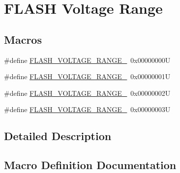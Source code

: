 \hypertarget{group___f_l_a_s_h_ex___voltage___range}{}\section{F\+L\+A\+SH Voltage Range}
\label{group___f_l_a_s_h_ex___voltage___range}
\subsection*{Macros}
\begin{DoxyCompactItemize}
\item 
\#define \hyperlink{group___f_l_a_s_h_ex___voltage___range_ga5cadf49a63c968cde3b980e5139d398e}{F\+L\+A\+S\+H\+\_\+\+V\+O\+L\+T\+A\+G\+E\+\_\+\+R\+A\+N\+G\+E\+\_}~0x00000000U
\item 
\#define \hyperlink{group___f_l_a_s_h_ex___voltage___range_gad047be2bc7aa9be946b5b0c6b3062ef3}{F\+L\+A\+S\+H\+\_\+\+V\+O\+L\+T\+A\+G\+E\+\_\+\+R\+A\+N\+G\+E\+\_}~0x00000001U
\item 
\#define \hyperlink{group___f_l_a_s_h_ex___voltage___range_ga50950407a789684eec9216f49e0831a0}{F\+L\+A\+S\+H\+\_\+\+V\+O\+L\+T\+A\+G\+E\+\_\+\+R\+A\+N\+G\+E\+\_}~0x00000002U
\item 
\#define \hyperlink{group___f_l_a_s_h_ex___voltage___range_gabf8037a482f18815c5a67f287223a658}{F\+L\+A\+S\+H\+\_\+\+V\+O\+L\+T\+A\+G\+E\+\_\+\+R\+A\+N\+G\+E\+\_}~0x00000003U
\end{DoxyCompactItemize}


\subsection{Detailed Description}


\subsection{Macro Definition Documentation}
\mbox{\label{group___f_l_a_s_h_ex___voltage___range_ga5cadf49a63c968cde3b980e5139d398e}} 

